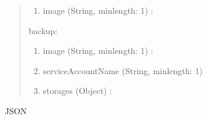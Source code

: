 \documentclass[letterpaper,10pt,english]{sphinxmanual}
\begin{document}
\begin{quote}
\begin{enumerate}
\item {} 
image (String, min\sphinxhyphen{}length: 1) : 

\end{enumerate}

backup:
\begin{enumerate}
%
\item {} 
image (String, min\sphinxhyphen{}length: 1) : 

\item {} 
serviceAccountName (String, min\sphinxhyphen{}length: 1) 

\item {} 
storages (Object) : 

\end{enumerate}
\end{quote}


JSON
\end{document}
